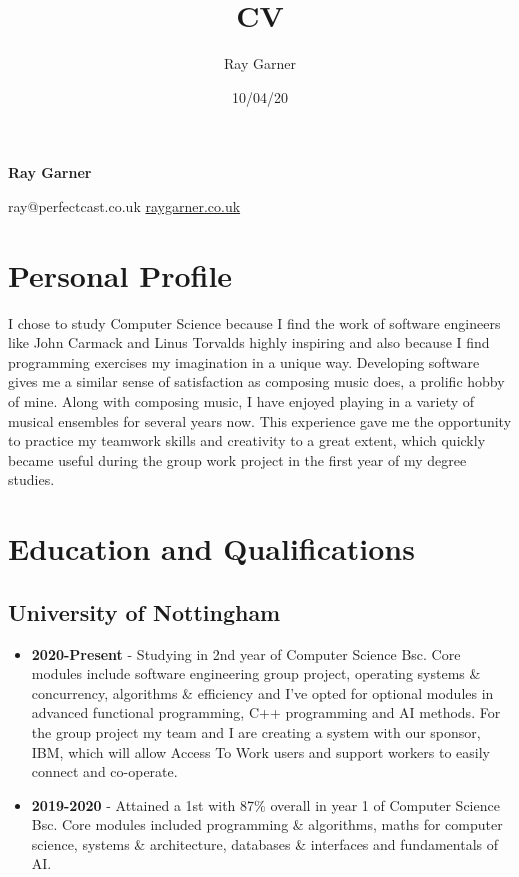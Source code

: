 \documentclass{article}
\title{CV}
\date{10/04/20}
\author{Ray Garner}
\makeatletter
\renewcommand{\maketitle}{
\begin{center}


{\huge\bfseries \vspace{-2cm} Ray Garner}
\vskip 0.25cm

{\large
ray@perfectcast.co.uk\hspace{0.5cm}
\href{https://www.raygarner.co.uk}{raygarner.co.uk}}

\vskip 0.25cm

\end{center}
}
\makeatother
\begin{document}
\maketitle
\section{Personal Profile}
I chose to study Computer Science because I find the work of software engineers like John Carmack and Linus Torvalds highly inspiring and also because I find programming exercises my imagination in a unique way.
Developing software gives me a similar sense of satisfaction as composing music does, a prolific hobby of mine.
Along with composing music, I have enjoyed playing in a variety of musical ensembles for several years now. 
This experience gave me the opportunity to practice my teamwork skills and creativity to a great extent, which quickly became useful during the group work project in the first year of my degree studies.



\section{Education and Qualifications}

\subsection{University of Nottingham}
\begin{itemize}[noitemsep]
\item \textbf{2020-Present} - Studying in 2nd year of Computer Science Bsc. Core modules include software engineering group project, operating systems \& concurrency, algorithms \& efficiency and I've opted for optional modules in advanced functional programming, C++ programming and AI methods. For the group project my team and I are creating a system with our sponsor, IBM, which will allow Access To Work users and support workers to easily connect and co-operate.

\item \textbf{2019-2020} - Attained a 1st with 87\% overall in year 1 of Computer Science Bsc. Core modules included programming \& algorithms, maths for computer science, systems \& architecture, databases \& interfaces and fundamentals of AI.


\end{itemize}
\end{document}
